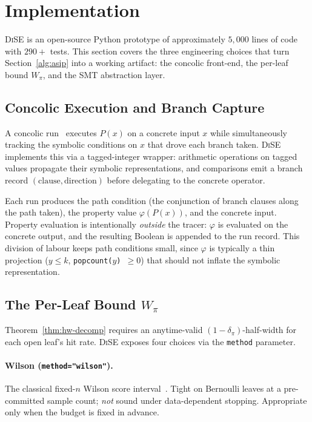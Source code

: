 \documentclass[runningheads]{llncs}
\providecommand{\Cref}[1]{Section~\ref{#1}}
\newcommand{\prog}{P}
\newcommand{\prop}{\varphi}
\newcommand{\toolname}{\textsc{DiSE}}
\newcommand{\code}[1]{\texttt{#1}}
\begin{document}
\section{Implementation}\label{sec:implementation}

\toolname{} is an open-source Python prototype
of approximately $5{,}000$ lines of code with $290+$ tests.  This
section covers the three engineering choices that turn
\Cref{alg:asip} into a working artifact: the concolic front-end, the
per-leaf bound $W_\pi$, and the SMT abstraction layer.

\subsection{Concolic Execution and Branch Capture}\label{sec:concolic}

A concolic run~\cite{sen2005cute,godefroid2005dart} executes $\prog(x)$
on a concrete input $x$ while simultaneously tracking the symbolic
conditions on $x$ that drove each branch taken.  \toolname{}
implements this via a tagged-integer wrapper: arithmetic operations on
tagged values propagate their symbolic representations, and comparisons
emit a branch record $(\text{clause},\text{direction})$ before
delegating to the concrete operator.

Each run produces the path condition (the conjunction of branch clauses
along the path taken), the property value $\prop(\prog(x))$, and the
concrete input.  Property evaluation is intentionally \emph{outside}
the tracer: $\prop$ is evaluated on the concrete output, and the
resulting Boolean is appended to the run record.  This division of
labour keeps path conditions small, since $\prop$ is typically a thin
projection (\code{$y \le k$}, \code{popcount($y$) $\ge 0$}) that
should not inflate the symbolic representation.

\subsection{The Per-Leaf Bound $W_\pi$}\label{sec:per-leaf-bound}

Theorem~\ref{thm:hw-decomp} requires an anytime-valid
$(1-\delta_\pi)$-half-width for each open leaf's hit rate.  \toolname{}
exposes four choices via the \code{method} parameter.

\paragraph{Wilson (\code{method="wilson"}).}
The classical fixed-$n$ Wilson score interval~\cite{wilson1927}.  Tight
on Bernoulli leaves at a pre-committed sample count; \emph{not} sound
under data-dependent stopping.  Appropriate only when the budget is
fixed in advance.
\end{document}
